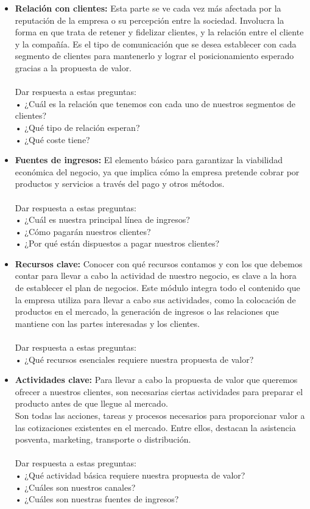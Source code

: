 \documentclass[preprint,12pt]{elsarticle}
\begin{document}
\begin{itemize}
	\item {\textbf{Relación con clientes: }} Esta parte se ve cada vez más afectada por la reputación de la empresa o su percepción entre la sociedad. Involucra la forma en que trata de retener y fidelizar clientes, y la relación entre el cliente y la compañía. Es el tipo de comunicación que se desea establecer con cada segmento de clientes para mantenerlo y lograr el posicionamiento esperado gracias a la propuesta de valor.  \\\\Dar respuesta a estas preguntas:\\ • ¿Cuál es la relación que tenemos con cada uno de nuestros segmentos de clientes? \\ • ¿Qué tipo de relación esperan? \\ • ¿Qué coste tiene?

	\item {\textbf{Fuentes de ingresos: }} El elemento básico para garantizar la viabilidad económica del negocio, ya que implica cómo la empresa pretende cobrar por productos y servicios a través del pago y otros métodos. \\\\Dar respuesta a estas preguntas:\\ • ¿Cuál es nuestra principal línea de ingresos?\\ • ¿Cómo pagarán nuestros clientes? \\ • ¿Por qué están dispuestos a pagar nuestros clientes? 

	\item {\textbf{Recursos clave: }} Conocer con qué recursos contamos y con los que debemos contar para llevar a cabo la actividad de nuestro negocio, es clave a la hora de establecer el plan de negocios. Este módulo integra todo el contenido que la empresa utiliza para llevar a cabo sus actividades, como la colocación de productos en el mercado, la generación de ingresos o las relaciones que mantiene con las partes interesadas y los clientes.\\\\Dar respuesta a estas preguntas:\\ • ¿Qué recursos esenciales requiere nuestra propuesta de valor?
	\item {\textbf{Actividades clave: }}Para llevar a cabo la propuesta de valor que queremos ofrecer a nuestros clientes, son necesarias ciertas actividades para preparar el producto antes de que llegue al mercado. \\Son todas las acciones, tareas y procesos necesarios para proporcionar valor a las cotizaciones existentes en el mercado. Entre ellos, destacan la asistencia posventa, marketing, transporte o distribución. \\\\Dar respuesta a estas preguntas:\\ • ¿Qué actividad básica requiere nuestra propuesta de valor? \\ • ¿Cuáles son nuestros canales? \\ • ¿Cuáles son nuestras fuentes de ingresos?


\end{itemize}
\end{document}
